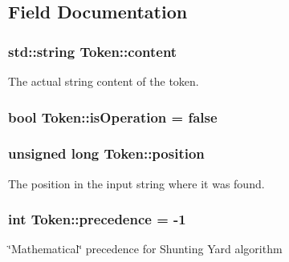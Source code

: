 \subsection{Field Documentation}
\subsubsection[{\texorpdfstring{content}{content}}]{\setlength{\rightskip}{0pt plus 5cm}std\+::string Token\+::content}\hypertarget{structToken_a0e29f6b35c314683c1a4729eb0d08739}{}\label{structToken_a0e29f6b35c314683c1a4729eb0d08739}


The actual string content of the token. 

\subsubsection[{\texorpdfstring{is\+Operation}{isOperation}}]{\setlength{\rightskip}{0pt plus 5cm}bool Token\+::is\+Operation = false}\hypertarget{structToken_a123afb499b20188ef2af42ff6b7d6591}{}\label{structToken_a123afb499b20188ef2af42ff6b7d6591}
\subsubsection[{\texorpdfstring{position}{position}}]{\setlength{\rightskip}{0pt plus 5cm}unsigned long Token\+::position}\hypertarget{structToken_ab8ddfabb4f48684b2ff8620948e12fcc}{}\label{structToken_ab8ddfabb4f48684b2ff8620948e12fcc}


The position in the input string where it was found. 

\subsubsection[{\texorpdfstring{precedence}{precedence}}]{\setlength{\rightskip}{0pt plus 5cm}int Token\+::precedence = -\/1}\hypertarget{structToken_adafb834c6a6e9e4ce4b0bf709f0b2bac}{}\label{structToken_adafb834c6a6e9e4ce4b0bf709f0b2bac}


\char`\"{}\+Mathematical\char`\"{} precedence for Shunting Yard algorithm 

